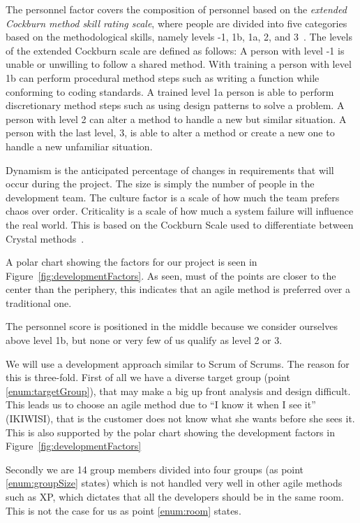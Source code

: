 The personnel factor covers the composition of personnel based on the \textit{extended Cockburn method skill rating scale}, where people are divided into five categories based on the methodological skills, namely levels -1, 1b, 1a, 2, and 3~\cite[p.~34]{boehmTurner}.
The levels of the extended Cockburn scale are defined as follows:
A person with level -1 is unable or unwilling to follow a shared method.
With training a person with level 1b can perform procedural method steps such as writing a function while conforming to coding standards.
A trained level 1a person is able to perform discretionary method steps such as using design patterns to solve a problem.
A person with level 2 can alter a method to handle a new but similar situation.
A person with the last level, 3, is able to alter a method or create a new one to handle a new unfamiliar situation.

Dynamism is the anticipated percentage of changes in requirements that will occur during the project.
The size is simply the number of people in the development team.
The culture factor is a scale of how much the team prefers chaos over order.
Criticality is a scale of how much a system failure will influence the real world.
This is based on the Cockburn Scale used to differentiate between Crystal methods~\cite{Larman04}.

A polar chart showing the factors for our project is seen in Figure~\ref{fig:developmentFactors}.
As seen, must of the points are closer to the center than the periphery, this indicates that an agile method is preferred over a traditional one.

The personnel score is positioned in the middle because we consider ourselves above level 1b, but none or very few of us qualify as level 2 or 3.


We will use a development approach similar to Scrum of Scrums.
The reason for this is three-fold.
First of all we have a diverse target group (point \ref{enum:targetGroup}), that may make a big up front analysis and design difficult.
This leads us to choose an agile method due to ``I know it when I see it'' (IKIWISI), that is the customer does not know what she wants before she sees it.
This is also supported by the polar chart showing the development factors in Figure~\ref{fig:developmentFactors}

Secondly we are 14 group members divided into four groups (as point \ref{enum:groupSize} states) which is not handled very well in other agile methods such as XP, which dictates that all the developers should be in the same room. 
This is not the case for us as point \ref{enum:room} states.

